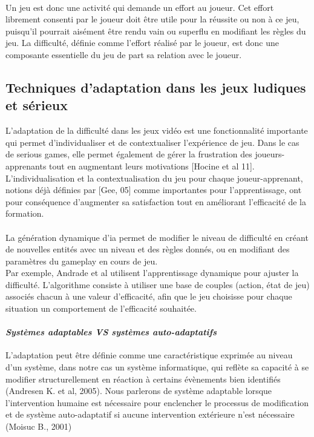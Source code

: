 \paragraph{}Un jeu est donc une activité qui demande un effort au joueur. Cet effort librement consenti par le joueur  doit être utile pour la réussite ou non à ce jeu, puisqu’il pourrait aisément être rendu vain ou superflu en modifiant les règles du jeu. La difficulté, définie comme l’effort réalisé par le joueur, est donc une composante essentielle du jeu de part sa relation avec le joueur.

		\subsection{Techniques d'adaptation dans les jeux ludiques et sérieux}
L'adaptation de la difficulté dans les jeux vidéo est une fonctionnalité importante qui permet d’individualiser et de contextualiser l'expérience de jeu. Dans le cas de serious games, elle permet également de gérer la frustration des joueurs-apprenants tout en augmentant leurs motivations [Hocine et al 11]. L'individualisation et la contextualisation du jeu pour chaque joueur-apprenant, notions déjà définies par [Gee, 05] comme importantes pour l'apprentissage, ont pour conséquence d'augmenter sa satisfaction tout en améliorant l’efficacité de la formation.
				
		\paragraph{}
La génération dynamique d’\gls{ia} permet de modifier le niveau de difficulté en créant de nouvelles entités avec un niveau et des règles donnés, ou en modifiant des paramètres du gameplay en cours de jeu.\\
Par exemple, Andrade et al utilisent l’apprentissage dynamique pour ajuster la difficulté. L’algorithme consiste à utiliser une base de couples (action, état de jeu) associés chacun à une valeur d’efficacité, afin que le jeu choisisse pour chaque situation un comportement de l’efficacité souhaitée.			
				
		\paragraph{\emph{Systèmes adaptables VS systèmes auto-adaptatifs} \\ \quad} 
L’adaptation peut être définie comme une caractéristique exprimée au niveau d’un système, dans notre cas un système informatique, qui reflète sa capacité à se modifier structurellement en réaction à certains évènements bien identifiés (Andresen K. et al, 2005). Nous parlerons de système adaptable lorsque l’intervention humaine est nécessaire pour enclencher le processus de modification et de système auto-adaptatif si aucune intervention extérieure n'est nécessaire (Moisuc B., 2001)

